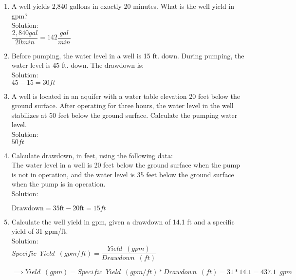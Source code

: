 \begin{enumerate}[1.]
\vspace{0.2cm}
\item A well yields 2,840 gallons in exactly 20 minutes. What is the well yield in gpm?\\
Solution:\\
\vspace{0.2cm}
$\dfrac{2,840gal}{20min}=\boxed{142\dfrac{gal}{min}}$


\vspace{0.2cm}
\item Before pumping, the water level in a well is 15 ft. down. During pumping, the water level is 45 ft. down. The drawdown is:\\
Solution:\\
\vspace{0.2cm}
$45-15=\boxed{30 ft}$


\vspace{0.2cm}
\item A well is located in an aquifer with a water table elevation 20 feet below the ground surface. After operating for three hours, the water level in the well stabilizes at 50 feet below the ground surface. Calculate the pumping water level.\\
Solution:\\
\vspace{0.2cm}
$\boxed{50ft}$


\vspace{0.2cm}
\item Calculate drawdown, in feet, using the following data:\\
The water level in a well is 20 feet below the ground surface when the pump is not in operation, and the water level is 35 feet below the ground surface when the pump is in operation.\\
Solution:\\
\vspace{0.2cm}

  $\text {Drawdown} = 35 \mathrm{ft}-20 \mathrm{ft}=\boxed{15ft}$\\


\vspace{0.2cm}
\item Calculate the well yield in gpm, given a drawdown of 14.1 ft and a specific yield of 31 gpm/ft.\\
Solution:\\
\vspace{0.2cm}
  $Specific \enspace Yield \enspace(gpm/ft) =\dfrac{ Yield \enspace(gpm)}{ Drawdown \enspace(ft)}$\\
  \vspace{0.2cm}

  $\implies Yield \enspace(gpm) = Specific \enspace Yield \enspace(gpm/ft)*Drawdown \enspace(ft)=31*14.1=\boxed{437.1 \enspace gpm}$

\end{enumerate}



